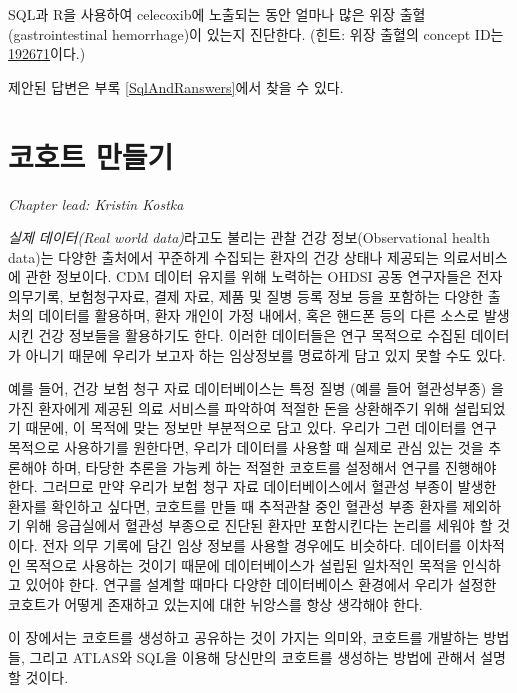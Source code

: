 \documentclass[11pt]{book}
\theoremstyle{definition}
\theoremstyle{definition}
\theoremstyle{definition}
\theoremstyle{remark}
\begin{document}
\protect\hypertarget{exr:exerciseGiBleedsDuringCelecoxib}{}{\label{exr:exerciseGiBleedsDuringCelecoxib}
}SQL과 R을 사용하여 celecoxib에 노출되는 동안 얼마나 많은 위장
출혈(gastrointestinal hemorrhage)이 있는지 진단한다. (힌트: 위장 출혈의
concept ID는
\href{http://athena.ohdsi.org/search-terms/terms/192671}{192671}이다.)

제안된 답변은 부록 \ref{SqlAndRanswers}에서 찾을 수 있다.

\chapter{코호트 만들기}\label{Cohorts}

\emph{Chapter lead: Kristin Kostka}

\emph{실제 데이터(Real world data)}라고도 불리는 관찰 건강
정보(Observational health data)는 다양한 출처에서 꾸준하게 수집되는
환자의 건강 상태나 제공되는 의료서비스에 관한 정보이다. CDM 데이터
유지를 위해 노력하는 OHDSI 공동 연구자들은 전자 의무기록, 보험청구자료,
결제 자료, 제품 및 질병 등록 정보 등을 포함하는 다양한 출처의 데이터를
활용하며, 환자 개인이 가정 내에서, 혹은 핸드폰 등의 다른 소스로 발생시킨
건강 정보들을 활용하기도 한다. 이러한 데이터들은 연구 목적으로 수집된
데이터가 아니기 때문에 우리가 보고자 하는 임상정보를 명료하게 담고 있지
못할 수도 있다.

예를 들어, 건강 보험 청구 자료 데이터베이스는 특정 질병 (예를 들어
혈관성부종) 을 가진 환자에게 제공된 의료 서비스를 파악하여 적절한 돈을
상환해주기 위해 설립되었기 때문에, 이 목적에 맞는 정보만 부분적으로 담고
있다. 우리가 그런 데이터를 연구 목적으로 사용하기를 원한다면, 우리가
데이터를 사용할 때 실제로 관심 있는 것을 추론해야 하며, 타당한 추론을
가능케 하는 적절한 코호트를 설정해서 연구를 진행해야 한다. 그러므로 만약
우리가 보험 청구 자료 데이터베이스에서 혈관성 부종이 발생한 환자를
확인하고 싶다면, 코호트를 만들 때 추적관찰 중인 혈관성 부종 환자를
제외하기 위해 응급실에서 혈관성 부종으로 진단된 환자만 포함시킨다는
논리를 세워야 할 것이다. 전자 의무 기록에 담긴 임상 정보를 사용할
경우에도 비슷하다. 데이터를 이차적인 목적으로 사용하는 것이기 때문에
데이터베이스가 설립된 일차적인 목적을 인식하고 있어야 한다. 연구를
설계할 때마다 다양한 데이터베이스 환경에서 우리가 설정한 코호트가 어떻게
존재하고 있는지에 대한 뉘앙스를 항상 생각해야 한다.

이 장에서는 코호트를 생성하고 공유하는 것이 가지는 의미와, 코호트를
개발하는 방법들, 그리고 ATLAS와 SQL을 이용해 당신만의 코호트를 생성하는
방법에 관해서 설명할 것이다.
\end{document}
